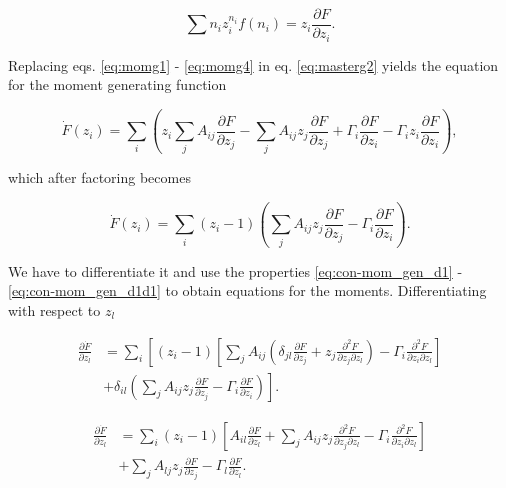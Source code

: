 \begin{equation}
  \label{eq:momg4}
  \sum n_iz_i^{n_i}f(n_i) = z_i\frac{\partial F}{\partial z_i}.
\end{equation}

Replacing eqs. \eqref{eq:momg1} - \eqref{eq:momg4} in eq. \eqref{eq:masterg2} yields the equation for the moment generating function

\begin{equation}
\dot{F}(z_i) = \sum_i\left( z_i\sum_jA_{ij}\frac{\partial F}{\partial z_j} - \sum_jA_{ij} z_j \frac{\partial F}{\partial z_j} + \Gamma_i\frac{\partial F}{\partial z_i} - \Gamma_iz_i\frac{\partial F}{\partial z_i}\right),
\end{equation}

which after factoring becomes

\begin{equation}
\label{eq:momg}
\dot{F}(z_i) = \sum_i(z_i-1)\left(\sum_jA_{ij} z_j \frac{\partial F}{\partial z_j} - \Gamma_i\frac{\partial F}{\partial z_i}\right).
\end{equation}

We have to differentiate it and use the properties \eqref{eq:con-mom_gen_d1} - \eqref{eq:con-mom_gen_d1d1} to obtain equations for the moments. Differentiating with respect to $z_l$

\begin{equation*}
\begin{split}
\frac{\partial \dot{F}}{\partial z_l} &= \sum_i\left[(z_i-1)\left[\sum_jA_{ij}\left(\delta_{jl}\frac{\partial F}{\partial z_j}+z_j\frac{\partial^2 F}{\partial z_j\partial z_l}\right)-\Gamma_i\frac{\partial^2 F}{\partial z_i\partial z_l}\right]\right.\\
&+\left.\delta_{il}\left(\sum_jA_{ij}z_j\frac{\partial F}{\partial z_j}-\Gamma_i\frac{\partial F}{\partial z_i}\right)\right].
\end{split}
\end{equation*}

\begin{equation*}
\begin{split}
\frac{\partial \dot{F}}{\partial z_l} &= \sum_i(z_i-1)\left[A_{il}\frac{\partial F}{\partial z_l}+\sum_jA_{ij}z_j\frac{\partial^2 F}{\partial z_j\partial z_l}-\Gamma_i\frac{\partial^2 F}{\partial z_i\partial z_l}\right]\\
&+\sum_jA_{lj}z_j\frac{\partial F}{\partial z_j}-\Gamma_l\frac{\partial F}{\partial z_l}.
\end{split}
\end{equation*}

